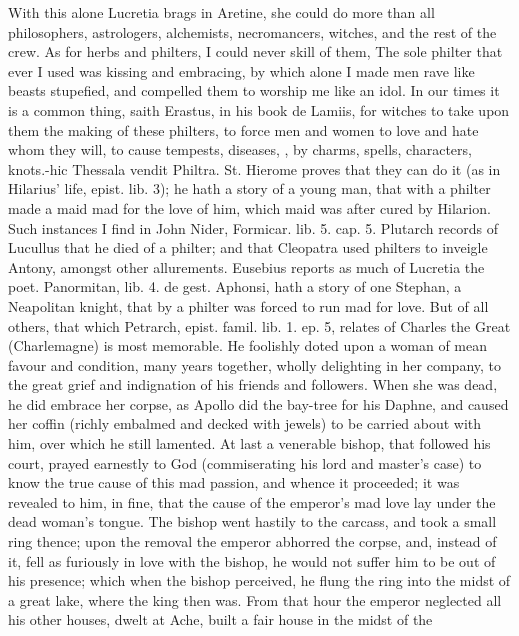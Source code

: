 With this alone Lucretia brags in Aretine, she could do more than
all philosophers, astrologers, alchemists, necromancers, witches, and
the rest of the crew. As for herbs and philters, I could never skill of
them, The sole philter that ever I used was kissing and embracing, by
which alone I made men rave like beasts stupefied, and compelled them
to worship me like an idol. In our times it is a common thing, saith
Erastus, in his book de Lamiis, for witches to take upon them the
making of these philters, to force men and women to love and hate
whom they will, to cause tempests, diseases, \etc{}, by charms, spells,
characters, knots.-hic Thessala vendit Philtra. St. Hierome
proves that they can do it (as in Hilarius' life, epist. lib. 3); he
hath a story of a young man, that with a philter made a maid mad for
the love of him, which maid was after cured by Hilarion. Such instances
I find in John Nider, Formicar. lib. 5. cap. 5. Plutarch records of
Lucullus that he died of a philter; and that Cleopatra used philters to
inveigle Antony, amongst other allurements. Eusebius reports as much of
Lucretia the poet. Panormitan, lib. 4. de gest. Aphonsi, hath a story
of one Stephan, a Neapolitan knight, that by a philter was forced to
run mad for love. But of all others, that which Petrarch, epist.
famil. lib. 1. ep. 5, relates of Charles the Great (Charlemagne) is
most memorable. He foolishly doted upon a woman of mean favour and
condition, many years together, wholly delighting in her company, to
the great grief and indignation of his friends and followers. When she
was dead, he did embrace her corpse, as Apollo did the bay-tree for his
Daphne, and caused her coffin (richly embalmed and decked with jewels)
to be carried about with him, over which he still lamented. At last a
venerable bishop, that followed his court, prayed earnestly to God
(commiserating his lord and master's case) to know the true cause of
this mad passion, and whence it proceeded; it was revealed to him, in
fine, that the cause of the emperor's mad love lay under the dead
woman's tongue. The bishop went hastily to the carcass, and took a
small ring thence; upon the removal the emperor abhorred the corpse,
and, instead of it, fell as furiously in love with the bishop, he
would not suffer him to be out of his presence; which when the bishop
perceived, he flung the ring into the midst of a great lake, where the
king then was. From that hour the emperor neglected all his other
houses, dwelt at Ache, built a fair house in the midst of the
